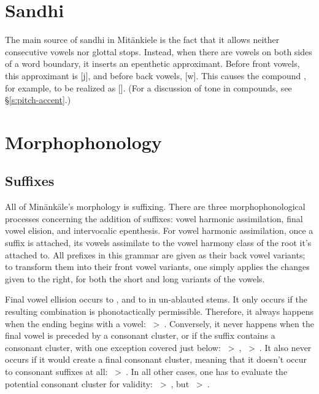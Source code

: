 \section{Sandhi}
The main source of sandhi in Mit\"ankiele is the fact that it allows neither
consecutive vowels nor glottal stops. Instead, when there are vowels on both
sides of a word boundary, it inserts an epenthetic approximant. Before front
vowels, this approximant is [j], and before back vowels, [w]. This causes the
compound , for example, to be realized as []. (For a
discussion of tone in compounds, see \S\ref{s:pitch-accent}.)

\section{Morphophonology}
\subsection{Suffixes}
All of Min\"ank\"ale's morphology is suffixing. There are three
morphophonological processes concerning the addition of suffixes: vowel harmonic
assimilation, final vowel elision, and intervocalic epenthesis.
For vowel harmonic assimilation, once a suffix is attached, its vowels assimilate
to the vowel harmony class of the root it's attached to. All prefixes in this
grammar are given as their back vowel variants; to transform them into their
front vowel variants, one simply applies the changes given to the right, for
both the short and long variants of the vowels.

Final vowel ellision occurs to , and to  in un-ablauted
stems. It only occurs if the resulting combination is phonotactically
permissible. Therefore, it always happens when the ending begins with a vowel:
~>~. Conversely, it never happens when the final vowel is
preceded by a consonant cluster, or if the suffix contains a consonant cluster,
with one exception covered just below: ~>~,
~>~. It also never occurs if it would create a final
consonant cluster, meaning that it doesn't occur to consonant suffixes at all:
~>~. In all other cases, one has to evaluate the potential
consonant cluster for validity: ~>~, but
~>~.


